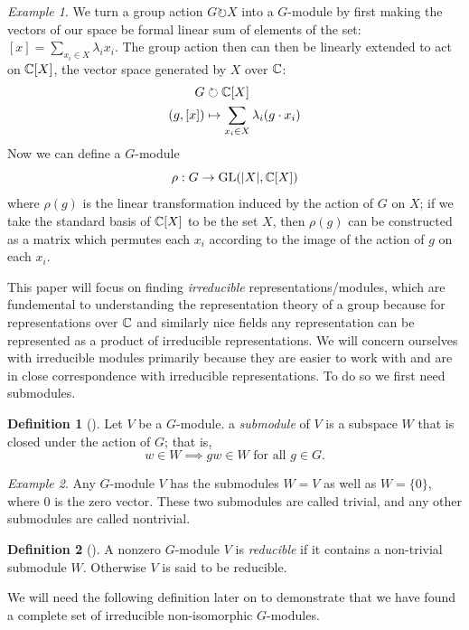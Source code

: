 \documentclass[12pt,twoside]{reedthesis}
\theoremstyle{plain}   %
\theoremstyle{definition}
\newtheorem{defn}{Definition}[section]
\theoremstyle{remark}
\newtheorem{ex}{Example}[section]
\numberwithin{equation}{section}
\def\GL{\mathrm{GL}} \def\SL{\mathrm{SL}}  \def\SP{\mathrm{SL}}\def\OG{\mathrm{O}}
\def\acts{\circlearrowright} %
\begin{document}
   \begin{ex} We turn a group action $G \acts X$ into a $G$-module by first making the vectors of our space be
     formal linear sum of elements of the set: $[x] = \sum_{x_i \in X} \lambda_i x_i$.
     The group action then can then be linearly extended to act on $\mathbb{C}[X]$, the vector space generated by $X$ over $\mathbb{C}$:
     \begin{align*}
       G &\acts \CC [X] \\
       (g,[x]) &\mapsto \sum_{x_i \in X} \lambda_i (g \cdot x_i)
     \end{align*}
     Now we can define a $G$-module
     \[ \rho: G \to \GL(|X|, \CC [X])\]
     where $\rho(g)$ is the linear transformation induced by the action of $G$ on $X$; if we take the standard basis of $\mathbb{C} [X]$ to be
     the set $X$, then $\rho(g)$ can be constructed as a matrix which permutes each $x_i$ according to the image of the action of $g$ on each $x_i$.
   \end{ex}
   This paper will focus on finding \emph{irreducible} representations/modules,
   which are fundemental to understanding the representation theory of a group because
   for representations over $\mathbb{C}$ and similarly nice fields any representation can be represented as a product of irreducible representations.
   We will concern ourselves with irreducible modules primarily because they are easier to work with and are in close correspondence
   with irreducible representations. To do so we first need submodules.
   \begin{defn}[{\cite[Definition 1.4.1]{sagan}}]
     Let $V$ be a $G$-module. a \emph{submodule}
     of $V$ is a subspace $W$ that is closed under the action of $G$; that is,
     \[w \in W \implies gw \in W \text{ for all } g \in G.\]
   \end{defn}
   \begin{ex}
     Any $G$-module $V$ has the submodules $W=V$ as well as $W= \{0\}$, where $0$ is the zero vector.
     These two submodules are called trivial, and any other submodules are called nontrivial.
   \end{ex}
   \begin{defn}[{\cite[Definition 1.4.1]{sagan}}]
     A nonzero $G$-module $V$ is \emph{reducible} if it contains a non-trivial submodule $W$.
     Otherwise $V$ is said to be reducible.
   \end{defn}

   We will need the following definition later on to demonstrate that we have found a complete set of irreducible non-isomorphic $G$-modules.
   
\end{document}
